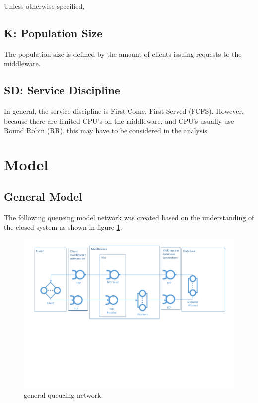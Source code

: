 \documentclass[a4paper]{article}
\begin{document}
Unless otherwise specified, 

\subsection{K: Population Size}

The population size is defined by the amount of clients issuing requests to the middleware.

\subsection{SD: Service Discipline}

In general, the service discipline is First Come, First Served (FCFS). However, because there are limited CPU's on the middleware, and CPU's usually use Round Robin (RR), this may have to be considered in the analysis.


\pagebreak

\section{Model}

\subsection{General Model}

The following queueing model network was created based on the understanding of the closed system as shown in figure \ref{fig:general-queueing-network}.

\begin{figure}[H]
	\begin{center}
    \includegraphics[scale=0.6, trim = 15mm 94mm 12mm 10mm, clip]{../drawings-ms2le/general-queueing-network.pdf}
  \end{center}
  \caption{general queueing network}
  \label{fig:general-queueing-network}
\end{figure}
\end{document}
